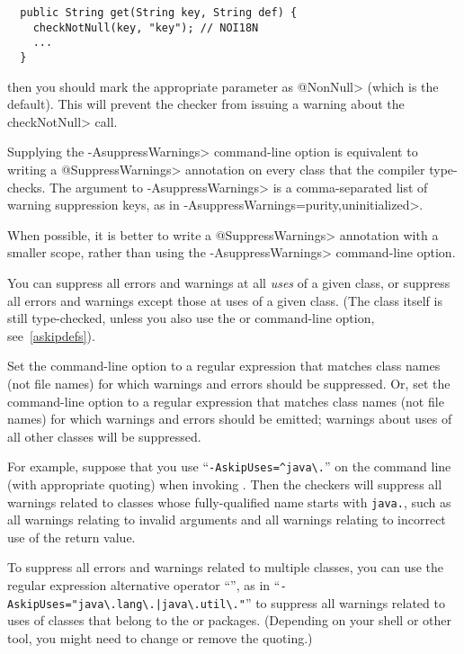 \begin{Verbatim}
  public String get(String key, String def) {
    checkNotNull(key, "key"); // NOI18N
    ...
  }
\end{Verbatim}

\noindent
then you should mark the appropriate parameter as \<@NonNull> (which is the
default).  This will prevent the checker from issuing a warning about the
\<checkNotNull> call.




Supplying the \<-AsuppressWarnings> command-line option is equivalent to
writing a \<@SuppressWarnings> annotation on every class that the compiler
type-checks.  The argument to \<-AsuppressWarnings> is a comma-separated
list of warning suppression keys, as in
\<-AsuppressWarnings=purity,uninitialized>.

When possible, it is better to write a \<@SuppressWarnings> annotation with a
smaller scope, rather than using the \<-AsuppressWarnings> command-line option.



You can suppress all errors and warnings at all \emph{uses} of a given
class, or suppress all errors and warnings except those at uses of a given
class.  (The class itself is still type-checked, unless you also use
the  or  command-line option, see~\ref{askipdefs}).

Set the  command-line option to a
regular expression that matches class names (not file names) for which warnings and errors
should be suppressed.
Or, set the  command-line option to a
regular expression that matches class names (not file names) for which warnings and errors
should be emitted; warnings about uses of all other classes will be suppressed.

For example, suppose that you use
``{\codesize\verb|-AskipUses=^java\.|}'' on the command line
(with appropriate quoting) when invoking
.  Then the checkers will suppress all warnings related to
classes whose fully-qualified name starts with \codesize\verb|java.|, such
as all warnings relating to invalid arguments and all warnings relating to
incorrect use of the return value.

To suppress all errors and warnings related to multiple classes, you can use
the regular expression alternative operator ``\code{|}'', as in
``{\codesize\verb+-AskipUses="java\.lang\.|java\.util\."+}'' to suppress
all warnings related to uses of classes that belong to the  or
 packages.  (Depending on your shell or other tool, you
might need to change or remove the quoting.)

